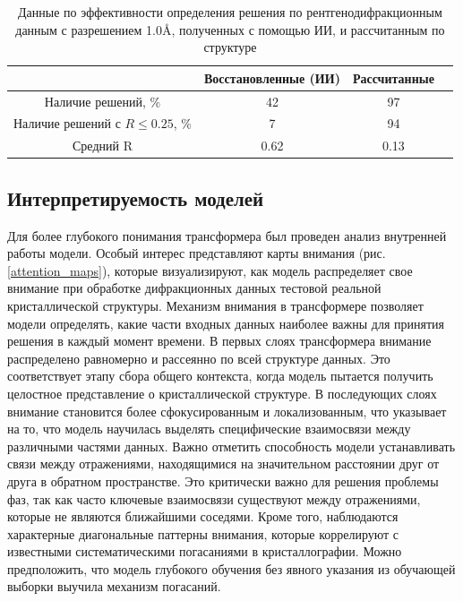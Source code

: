 \begin{table}[H]
	\caption{Данные по эффективности определения решения по рентгенодифракционным данным с разрешением 1.0\AA , полученных с помощью ИИ, и рассчитанным по структуре}
	\label{restor13tabl}
	\centering
	\begin{tabular}{|c|c|c|c|} 
		\hline
		\diagbox{\textbf{Показатель}}{\textbf{Данные}} & \textbf{Восстановленные (ИИ)} & \textbf{Рассчитанные}  \\ 
		\hline
		Наличие решений, \%                               & 42      & 97                          \\ 
		\hline
		Наличие решений с $R\leq 0.25$, \%                                & 7         & 94                               \\
		\hline
		Средний R                                          & 0.62                & 0.13                 \\
		\hline
	\end{tabular}
\end{table}

\subsection{Интерпретируемость моделей}

Для более глубокого понимания трансформера был проведен анализ внутренней работы модели. Особый интерес представляют карты внимания (рис. \ref{attention_maps}), которые визуализируют, как модель распределяет свое внимание при обработке дифракционных данных тестовой реальной кристаллической структуры. Механизм внимания в трансформере позволяет модели определять, какие части входных данных наиболее важны для принятия решения в каждый момент времени. В первых слоях трансформера внимание распределено равномерно и рассеянно по всей структуре данных. Это соответствует этапу сбора общего контекста, когда модель пытается получить целостное представление о кристаллической структуре. В последующих слоях внимание становится более сфокусированным и локализованным, что указывает на то, что модель научилась выделять специфические взаимосвязи между различными частями данных. Важно отметить способность модели устанавливать связи между отражениями, находящимися на значительном расстоянии друг от друга в обратном пространстве. Это критически важно для решения проблемы фаз, так как часто ключевые взаимосвязи существуют между отражениями, которые не являются ближайшими соседями. Кроме того, наблюдаются характерные диагональные паттерны внимания, которые коррелируют с известными систематическими погасаниями в кристаллографии. Можно предположить, что модель глубокого обучения без явного указания из обучающей выборки выучила механизм погасаний.

